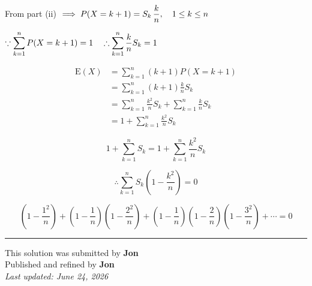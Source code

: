 \documentclass[12pt]{article}
\begin{document}
From part (ii) $\implies \displaystyle P(X=k+1)=S_k\,\frac{k}{n},\quad 1\leq k\leq n$

$\because \displaystyle \sum_{k=1}^{n}P(X=k+1)=1\quad \therefore \sum_{k=1}^{n}\frac{k}{n}S_k=1$

\begin{align*}
\mathrm{E}(X)
&=\sum_{k=1}^{n}(k+1)P(X=k+1)\\
&=\sum_{k=1}^{n}(k+1)\frac{k}{n}S_k\\
&=\sum_{k=1}^{n}\frac{k^2}{n}S_k+\sum_{k=1}^{n}\frac{k}{n}S_k\\
&=1+\sum_{k=1}^{n}\frac{k^2}{n}S_k
\end{align*}


$$1+\sum_{k=1}^{n}S_k=1+\sum_{k=1}^{n}\frac{k^2}{n}S_k$$

$$\therefore \sum_{k=1}^{n}S_k\left(1-\frac{k^2}{n}\right)=0$$

$$\boxed{\left(1-\frac{1^2}{n}\right)+\left(1-\frac1n\right)\left(1-\frac{2^2}{n}\right)+\left(1-\frac1n\right)\left(1-\frac2n\right)\left(1-\frac{3^2}{n}\right)+\cdots=0}$$

\bigskip
\hrule
\begin{center}
    This solution was submitted by \textbf{Jon}\\[4pt]
    Published and refined by \textbf{Jon}\\[8pt]
    \textit{Last updated: June 24, 2026}
\end{center}
\end{document}
